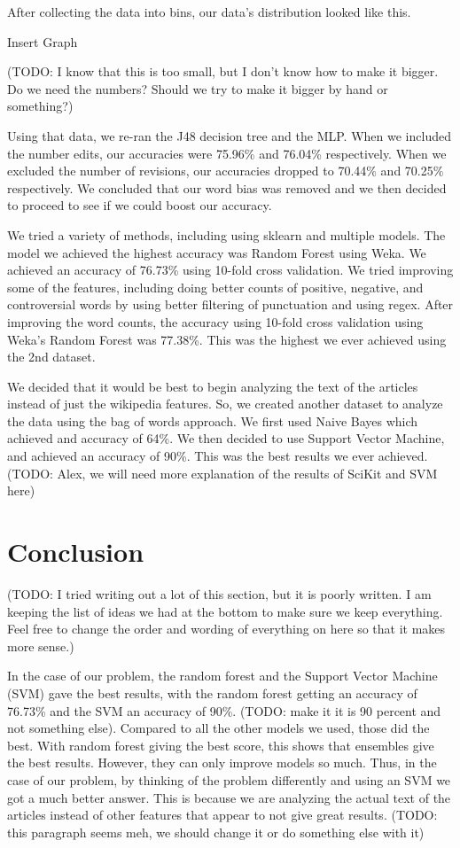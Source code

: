 \documentclass{article}
\begin{document}
After collecting the data into bins, our data’s distribution looked like this. 

Insert Graph

(TODO: I know that this is too small, but I don’t know how to make it bigger. Do we need the numbers? Should we try to make it bigger by hand or something?)

Using that data, we re-ran the J48 decision tree and the MLP.
When we included the number edits, our accuracies were 75.96\% and 76.04\% respectively. 
When we excluded the number of revisions, our accuracies dropped to 70.44\% and 70.25\% respectively. 
We concluded that our word bias was removed and we then decided to proceed to see if we could boost our accuracy. 

We tried a variety of methods, including using sklearn and multiple models. 
The model we achieved the highest accuracy was Random Forest using Weka. 
We achieved an accuracy of 76.73\% using 10-fold cross validation. 
We tried improving some of the features, including doing better counts of positive, negative, and controversial words by using better filtering of punctuation and using regex. 
After improving the word counts, the accuracy using 10-fold cross validation using Weka’s Random Forest was 77.38\%. 
This was the highest we ever achieved using the 2nd dataset. 

We decided that it would be best to begin analyzing the text of the articles instead of just the wikipedia features. 
So, we created another dataset to analyze the data using the bag of words approach. 
We first used Naive Bayes which achieved and accuracy of 64\%. 
We then decided to use Support Vector Machine, and achieved an accuracy of 90\%. 
This was the best results we ever achieved. 
(TODO: Alex, we will need more explanation of the results of SciKit and SVM here) 

\section{Conclusion}

(TODO: I tried writing out a lot of this section, but it is poorly written. 
I am keeping the list of ideas we had at the bottom to make sure we keep everything. 
Feel free to change the order and wording of everything on here so that it makes more sense.)

In the case of our problem, the random forest and the Support Vector Machine (SVM) gave the best results, with the random forest getting an accuracy of 76.73\% and the SVM an accuracy of 90\%. 
(TODO: make it it is 90 percent and not something else). 
Compared to all the other models we used, those did the best. 
With random forest giving the best score, this shows that ensembles give the best results. 
However, they can only improve models so much. Thus, in the case of our problem, by thinking of the problem differently and using an SVM we got a much better answer. 
This is because we are analyzing the actual text of the articles instead of other features that appear to not give great results.
(TODO: this paragraph seems meh, we should change it or do something else with it)
\end{document}
